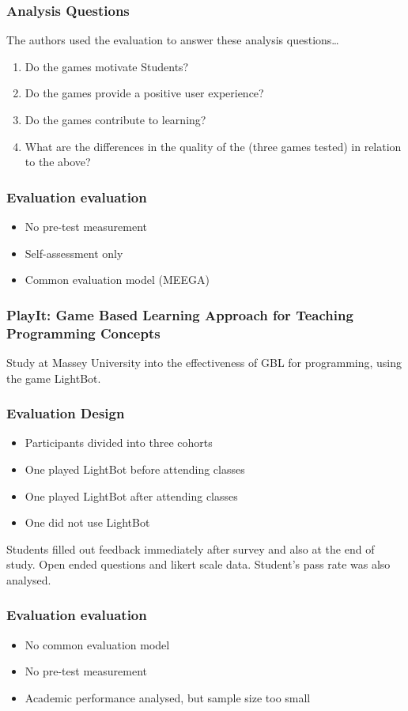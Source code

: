 \documentclass{beamer}
\begin{document}
\begin{frame}
  \frametitle{Analysis Questions}
  The authors used the evaluation to answer these analysis questions\dots
  \begin{enumerate}
    \item Do the games motivate Students?
    \item Do the games provide a positive user experience?
    \item Do the games contribute to learning?
    \item What are the differences in the quality of the (three games tested) in relation to the above?
  \end{enumerate}
\end{frame}
\begin{frame}
  \frametitle{Evaluation evaluation}
  \begin{itemize}
    \item No pre-test measurement
    \item Self-assessment only
    \item Common evaluation model (MEEGA)
  \end{itemize}
\end{frame}
\begin{frame}
  \frametitle{PlayIt: Game Based Learning Approach for Teaching Programming Concepts}
  Study at Massey University into the effectiveness of GBL for programming, using the game LightBot.
\end{frame}
\begin{frame}
  \frametitle{Evaluation Design}
  \begin{itemize}
    \item Participants divided into three cohorts
    \item One played LightBot before attending classes
    \item One played LightBot after attending classes
    \item One did not use LightBot
  \end{itemize}
  Students filled out feedback immediately after survey and also at the end of study. Open ended questions and likert scale data. Student's pass rate was also analysed.
\end{frame}
\begin{frame}
  \frametitle{Evaluation evaluation}
  \begin{itemize}
    \item No common evaluation model
    \item No pre-test measurement
    \item Academic performance analysed, but sample size too small
  \end{itemize}
\end{frame}
\end{document}
